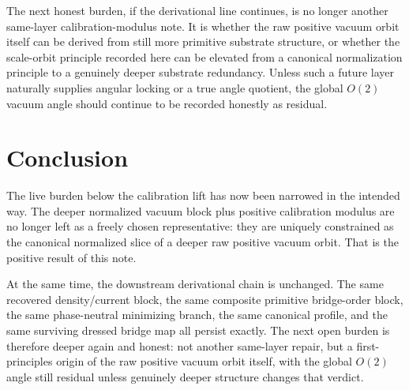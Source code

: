 \documentclass[11pt]{article}
\begin{document}
The next honest burden, if the derivational line continues, is no longer another same-layer calibration-modulus note. It is whether the raw positive vacuum orbit itself can be derived from still more primitive substrate structure, or whether the scale-orbit principle recorded here can be elevated from a canonical normalization principle to a genuinely deeper substrate redundancy. Unless such a future layer naturally supplies angular locking or a true angle quotient, the global \(O(2)\) vacuum angle should continue to be recorded honestly as residual.

\section{Conclusion}

The live burden below the calibration lift has now been narrowed in the intended way. The deeper normalized vacuum block plus positive calibration modulus are no longer left as a freely chosen representative: they are uniquely constrained as the canonical normalized slice of a deeper raw positive vacuum orbit. That is the positive result of this note.

At the same time, the downstream derivational chain is unchanged. The same recovered density/current block, the same composite primitive bridge-order block, the same phase-neutral minimizing branch, the same canonical profile, and the same surviving dressed bridge map all persist exactly. The next open burden is therefore deeper again and honest: not another same-layer repair, but a first-principles origin of the raw positive vacuum orbit itself, with the global \(O(2)\) angle still residual unless genuinely deeper structure changes that verdict.
\end{document}
